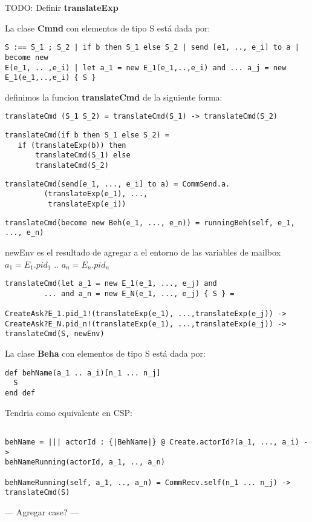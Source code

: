 \documentclass[fleqn]{article}
\begin{document}
TODO: Definir \textbf{translateExp}

La clase \textbf{Cmnd} con elementos de tipo S está dada por:

\begin{verbatim}
S :== S_1 ; S_2 | if b then S_1 else S_2 | send [e1, .., e_i] to a | become new
E(e_1, .. ,e_i) | let a_1 = new E_1(e_1,..,e_i) and ... a_j = new
E_1(e_1,..,e_i) { S } 
\end{verbatim}

definimos la funcion \textbf{translateCmd} de la siguiente forma:

\begin{verbatim}
translateCmd (S_1 S_2) = translateCmd(S_1) -> translateCmd(S_2)
\end{verbatim}


\begin{verbatim}
translateCmd(if b then S_1 else S_2) = 
   if (translateExp(b)) then
       translateCmd(S_1) else 
       translateCmd(S_2)
\end{verbatim}

\begin{verbatim}
translateCmd(send[e_1, ..., e_i] to a) = CommSend.a.
         (translateExp(e_1), ..., 
          translateExp(e_i)) 
\end{verbatim}

\begin{verbatim}
translateCmd(become new Beh(e_1, ..., e_n)) = runningBeh(self, e_1, ..., e_n)
\end{verbatim}

newEnv es el resultado de agregar a el entorno de las variables de mailbox $a_1
= E_1.pid_1$ .. $a_n = E_n.pid_n$
\begin{verbatim}
translateCmd(let a_1 = new E_1(e_1, ..., e_j) and 
         ... and a_n = new E_N(e_1, ..., e_j) { S } = 

CreateAsk?E_1.pid_1!(translateExp(e_1), ...,translateExp(e_j)) ->
CreateAsk?E_N.pid_n!(translateExp(e_1), ...,translateExp(e_j)) ->
translateCmd(S, newEnv)
\end{verbatim}


La clase \textbf{Beha} con elementos de tipo S está dada por:

\begin{verbatim}
def behName(a_1 .. a_i)[n_1 ... n_j]
  S
end def
\end{verbatim}

Tendria como equivalente en CSP:

\begin{verbatim}

behName = ||| actorId : {|BehName|} @ Create.actorId?(a_1, ..., a_i) ->
behNameRunning(actorId, a_1, .., a_n)

behNameRunning(self, a_1, .., a_n) = CommRecv.self(n_1 ... n_j) -> translateCmd(S)

\end{verbatim}

--- Agregar case? ---

{}

\end{document}
